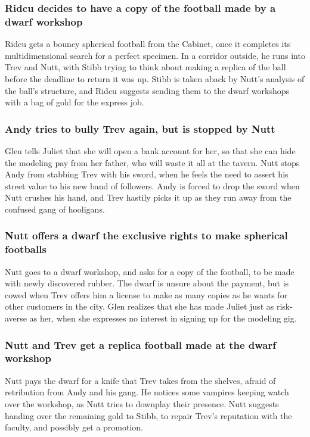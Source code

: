 \subsubsection{\Gls{Ridcu} decides to have a copy of the football made by a dwarf workshop}
\Gls{Ridcu} gets a bouncy spherical football from the Cabinet, once it completes its
multidimensional search for a perfect specimen. In a corridor outside, he runs into \Gls{Trev} and
\Gls{Nutt}, with \Gls{Stibb} trying to think about making a replica of the ball before the deadline
to return it was up. \Gls{Stibb} is taken aback by \Gls{Nutt}'s analysis of the ball's structure,
and \Gls{Ridcu} suggests sending them to the dwarf workshops with a bag of gold for the express job.

\subsubsection{\Gls{Andy} tries to bully \Gls{Trev} again, but is stopped by \Gls{Nutt}}
\Gls{Glen} tells \Gls{Juliet} that she will open a bank account for her, so that she can hide
the modeling pay from her father, who will waste it all at the tavern. \Gls{Nutt} stops \Gls{Andy}
from stabbing \Gls{Trev} with his sword, when he feels the need to assert his street value to his
new band of followers. \Gls{Andy} is forced to drop the sword when \Gls{Nutt} crushes his hand,
and \Gls{Trev} hastily picks it up as they run away from the confused gang of hooligans.

\subsubsection{\Gls{Nutt} offers a dwarf the exclusive rights to make spherical footballs}
\Gls{Nutt} goes to a dwarf workshop, and asks for a copy of the football, to be made with newly
discovered rubber. The dwarf is unsure about the payment, but is cowed when \Gls{Trev} offers him a
license to make as many copies as he wants for other customers in the city. \Gls{Glen} realizes that
she has made \Gls{Juliet} just as risk-averse as her, when she expresses no interest in signing up
for the modeling gig.

\subsubsection{\Gls{Nutt} and \Gls{Trev} get a replica football made at the dwarf workshop}
\Gls{Nutt} pays the dwarf for a knife that \Gls{Trev} takes from the shelves, afraid of retribution
from \Gls{Andy} and his gang. He notices some vampires keeping watch over the workshop, as
\Gls{Nutt} tries to downplay their presence. \Gls{Nutt} suggests handing over the remaining gold
to \Gls{Stibb}, to repair \Gls{Trev}'s reputation with the faculty, and possibly get a promotion.

